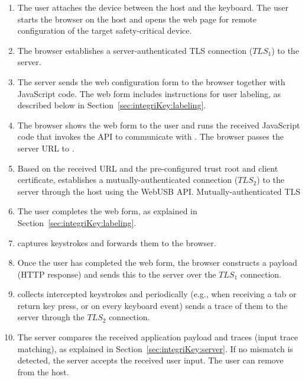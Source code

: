 \begin{enumerate}
    \item The user attaches the \device device between the host and the keyboard. The user starts the browser on the host and opens the web page for remote configuration of the target safety-critical device. 

    \item The browser establishes a server-authenticated TLS connection ($TLS_1$) to the server. 

    \item The server sends the web configuration form to the browser together with JavaScript code. The web form includes instructions for user labeling, as described below in Section~\ref{sec:integriKey:labeling}.
    
    \item The browser shows the web form to the user and runs the received JavaScript code that invokes the \webusb API to communicate with \device. The browser passes the server URL to \device.

    \item Based on the received URL and the pre-configured trust root and client certificate, \device establishes a mutually-authenticated \tls connection ($TLS_2$) to the server through the host using the WebUSB API. Mutually-authenticated TLS 

    \item The user completes the web form, as explained in Section~\ref{sec:integriKey:labeling}.
    
    \item \device captures keystrokes and forwards them to the browser.
    
    \item Once the user has completed the web form, the browser constructs a payload (HTTP response) and sends this to the server over the $TLS_1$ connection.
    
    \item \device collects intercepted keystrokes and periodically (e.g., when receiving a tab or return key press, or on every keyboard event) sends a trace of them to the server through the $TLS_2$ connection. 

    \item The server compares the received application payload and traces (input trace matching), as explained in Section~\ref{sec:integriKey:server}. If no mismatch is detected, the server accepts the received user input. The user can remove \device from the host.
\end{enumerate}

